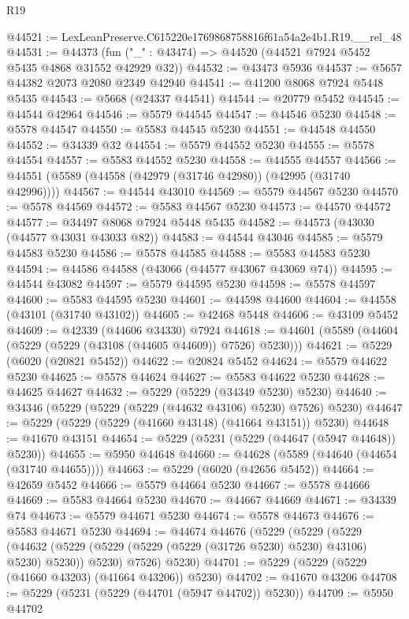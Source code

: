 \begin{lexlean}{R19}
\begin{coremodule}
@44521 := LexLeanPreserve.C615220e1769868758816f61a54a2e4b1.R19.__rel_48
@44531 := @44373 (fun ("_" : @43474) => @44520 (@44521 @7924 @5452 @5435 @4868 @31552 @42929 @32))
@44532 := @43473 @5936
@44537 := @5657 @44382 @2073 @2080 @2349 @42940
@44541 := @41200 @8068 @7924 @5448 @5435
@44543 := @5668 (@24337 @44541)
@44544 := @20779 @5452
@44545 := @44544 @42964
@44546 := @5579 @44545
@44547 := @44546 @5230
@44548 := @5578 @44547
@44550 := @5583 @44545 @5230
@44551 := @44548 @44550
@44552 := @34339 @32
@44554 := @5579 @44552 @5230
@44555 := @5578 @44554
@44557 := @5583 @44552 @5230
@44558 := @44555 @44557
@44566 := @44551 (@5589 (@44558 (@42979 (@31746 @42980)) (@42995 (@31740 @42996))))
@44567 := @44544 @43010
@44569 := @5579 @44567 @5230
@44570 := @5578 @44569
@44572 := @5583 @44567 @5230
@44573 := @44570 @44572
@44577 := @34497 @8068 @7924 @5448 @5435
@44582 := @44573 (@43030 (@44577 @43031 @43033 @82))
@44583 := @44544 @43046
@44585 := @5579 @44583 @5230
@44586 := @5578 @44585
@44588 := @5583 @44583 @5230
@44594 := @44586 @44588 (@43066 (@44577 @43067 @43069 @74))
@44595 := @44544 @43082
@44597 := @5579 @44595 @5230
@44598 := @5578 @44597
@44600 := @5583 @44595 @5230
@44601 := @44598 @44600
@44604 := @44558 (@43101 (@31740 @43102))
@44605 := @42468 @5448
@44606 := @43109 @5452
@44609 := @42339 (@44606 @34330) @7924
@44618 := @44601 (@5589 (@44604 (@5229 (@5229 (@43108 (@44605 @44609)) @7526) @5230)))
@44621 := @5229 (@6020 (@20821 @5452))
@44622 := @20824 @5452
@44624 := @5579 @44622 @5230
@44625 := @5578 @44624
@44627 := @5583 @44622 @5230
@44628 := @44625 @44627
@44632 := @5229 (@5229 (@34349 @5230) @5230)
@44640 := @34346 (@5229 (@5229 (@5229 (@44632 @43106) @5230) @7526) @5230)
@44647 := @5229 (@5229 (@5229 (@41660 @43148) (@41664 @43151)) @5230)
@44648 := @41670 @43151
@44654 := @5229 (@5231 (@5229 (@44647 (@5947 @44648)) @5230))
@44655 := @5950 @44648
@44660 := @44628 (@5589 (@44640 (@44654 (@31740 @44655))))
@44663 := @5229 (@6020 (@42656 @5452))
@44664 := @42659 @5452
@44666 := @5579 @44664 @5230
@44667 := @5578 @44666
@44669 := @5583 @44664 @5230
@44670 := @44667 @44669
@44671 := @34339 @74
@44673 := @5579 @44671 @5230
@44674 := @5578 @44673
@44676 := @5583 @44671 @5230
@44694 := @44674
    @44676
    (@5229
      (@5229
        (@5229
          (@44632 (@5229 (@5229 (@5229 (@5229 (@31726 @5230) @5230) @43106) @5230) @5230))
          @5230)
        @7526)
      @5230)
@44701 := @5229 (@5229 (@5229 (@41660 @43203) (@41664 @43206)) @5230)
@44702 := @41670 @43206
@44708 := @5229 (@5231 (@5229 (@44701 (@5947 @44702)) @5230))
@44709 := @5950 @44702

\end{coremodule}
\end{lexlean}
